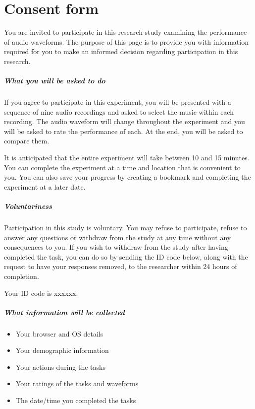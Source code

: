\chapter{Consent form}\label{app:consent}
You are invited to participate in this research study examining the performance
of audio waveforms. The purpose of this page is to provide you with information
required for you to make an informed decision regarding participation in this
research.

\paragraph{What you will be asked to do}
If you agree to participate in this experiment, you will be presented with a
sequence of nine audio recordings and asked to select the music within each
recording. The audio waveform will change throughout the experiment and you
will be asked to rate the performance of each. At the end, you will be asked to
compare them.

It is anticipated that the entire experiment will take between 10 and 15
minutes. You can complete the experiment at a time and location that is
convenient to you. You can also save your progress by creating a bookmark and
completing the experiment at a later date.

\paragraph{Voluntariness}
Participation in this study is voluntary. You may refuse to participate, refuse
to answer any questions or withdraw from the study at any time without any
consequences to you. If you wish to withdraw from the study after having
completed the task, you can do so by sending the ID code below, along with the
request to have your responses removed, to the researcher within 24 hours of
completion.

Your ID code is xxxxxx.

\paragraph{What information will be collected}
{\singlespacing
\begin{itemize}
\item Your browser and OS details
\item Your demographic information
\item Your actions during the tasks
\item Your ratings of the tasks and waveforms
\item The date/time you completed the tasks
\end{itemize}
}


